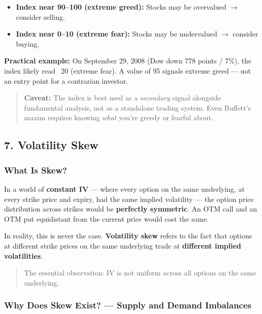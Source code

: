 \documentclass[12pt,openany]{book}
\begin{document}
\begin{itemize}[leftmargin=*]
    \item \textbf{Index near 90–100 (extreme greed):} Stocks may be overvalued \(\rightarrow\) consider selling.
    \item \textbf{Index near 0–10 (extreme fear):} Stocks may be undervalued \(\rightarrow\) consider buying.
\end{itemize}

\textbf{Practical example:} On September 29, 2008 (Dow down 778 points / 7\%), the index likely read ~20 (extreme fear). A value of 95 signals extreme greed — not an entry point for a contrarian investor.

\begin{quote}
\textbf{Caveat:} The index is best used as a \emph{secondary} signal alongside fundamental analysis, not as a standalone trading system. Even Buffett's maxim requires knowing \emph{what} you're greedy or fearful about.
\end{quote}

\subsection{7. Volatility Skew}

\subsubsection{What Is Skew?}

In a world of \textbf{constant IV} — where every option on the same underlying, at every strike price and expiry, had the same implied volatility — the option price distribution across strikes would be \textbf{perfectly symmetric}. An OTM call and an OTM put equidistant from the current price would cost the same.

In reality, this is never the case. \textbf{Volatility skew} refers to the fact that options at different strike prices on the same underlying trade at \textbf{different implied volatilities}.

\begin{quote}
The essential observation: IV is not uniform across all options on the same underlying.
\end{quote}

\subsubsection{Why Does Skew Exist? — Supply and Demand Imbalances}
\end{document}
